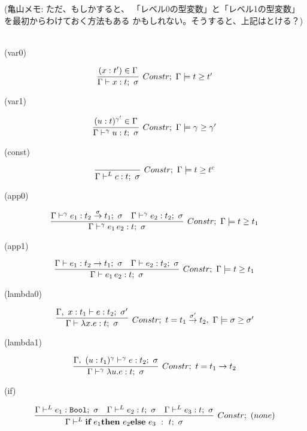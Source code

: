 (亀山メモ:
ただ、もしかすると、
「レベル0の型変数」と「レベル1の型変数」を最初からわけておく方法もある
かもしれない。そうすると、上記はとける？)


\\
(var0)

\[
  \infer[Constr;~\Gamma \models \longer{t}{t'}]
  {\Gamma \vdash x:t;~\sigma}
  {(x:t') \in \Gamma
  }
\]

(var1)

\[
  \infer[Constr;~\Gamma \models \longer{\gamma}{\gamma'}]
  {\Gamma \vdash^{\gamma} u:t;~\sigma}
  {(u:t)^{\gamma'} \in \Gamma
  }
\]

(const)

\[
  \infer[Constr;~\Gamma \models \longer{t}{t^c}]
  {\Gamma \vdash^{L} c:t;~\sigma}
  {}
\]

(app0)

\[
  \infer[Constr;~\Gamma \models \longer{t}{t_1}]
  {\Gamma \vdash^\gamma e_1 \, e_2 : t;~\sigma}
  {\Gamma \vdash^\gamma e_1 : \funT{t_2}{t_1}{\sigma};~\sigma
    &\Gamma \vdash^\gamma e_2 : t_2;~\sigma
  }
\]

(app1)

\[
  \infer[Constr;~\Gamma \models \longer{t}{t_1}]
  {\Gamma \vdash e_1 \, e_2 : t;~\sigma}
  {\Gamma \vdash e_1 : t_2 \to t_1;~\sigma
    &\Gamma \vdash e_2 : t_2;~\sigma
  }
\]

(lambda0)

\[
  \infer[Constr;~t=\funT{t_1}{t_2}{\sigma'},~ \Gamma \models \sigma \ord \sigma' ]
  {\Gamma \vdash \lambda x.e : t;~\sigma}
  {\Gamma,~x:t_1 \vdash e : t_2;~\sigma'}
\]

(lambda1) \\

\[
  \infer[Constr;~t=\funT{t_1}{t_2}{}]
  {\Gamma \vdash^\gamma \lambda u.e : t;~\sigma}
  {\Gamma,~(u:t_1)^\gamma \vdash^\gamma e : t_2;~\sigma}
\]

(if)

\[
  \infer[Constr;~(none)]
  {\Gamma \vdash^L
    \textbf{if}~e_1 \textbf{then}~e_2 \textbf{else}~e_3 ~:~t; ~ \sigma}
  {\Gamma \vdash^L e_1 : \Bool;~\sigma
    &\Gamma \vdash^L e_2 : t;~\sigma
    &\Gamma \vdash^L e_3 : t;~\sigma
  }
\]


